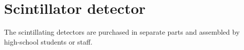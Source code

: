 \chapter{Scintillator detector}
\label{ch:detector}


The scintillating detectors are purchased in separate parts and assembled by
high-school students or staff.






